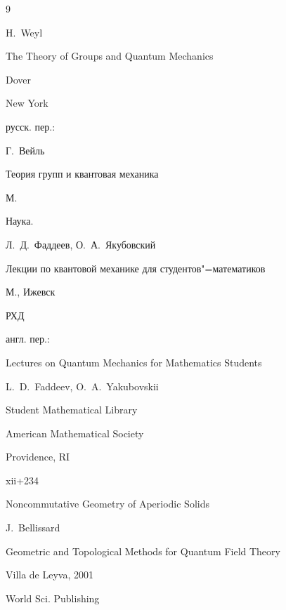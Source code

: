 \begin{thebibliography}{9}




\by H.~Weyl

\book The Theory of Groups and Quantum Mechanics

\publ Dover

\publaddr New York



\rtransl русск. пер.:~

\by Г.~Вейль

\book Теория групп и квантовая механика

\publaddr М.

\publ Наука. 






\by Л.~Д.~Фаддеев, О.~А.~Якубовский

\book Лекции по квантовой механике для студентов"=математиков

\publaddr М., Ижевск

\publ РХД



\transl англ. пер.:~

\book Lectures on Quantum Mechanics for Mathematics Students

\by L.~D.~Faddeev, O.~A.~Yakubovskii


\serial Student Mathematical Library

\publ American Mathematical Society


\publaddr Providence, RI

\totalpages xii+234




\paper Noncommutative Geometry of Aperiodic Solids 

\by   J.~Bellissard

\inbook Geometric and Topolo\-gical Methods for Quantum Field Theory

\procinfo Villa de Leyva, 2001

\publ World Sci. Publishing


\end{thebibliography}
